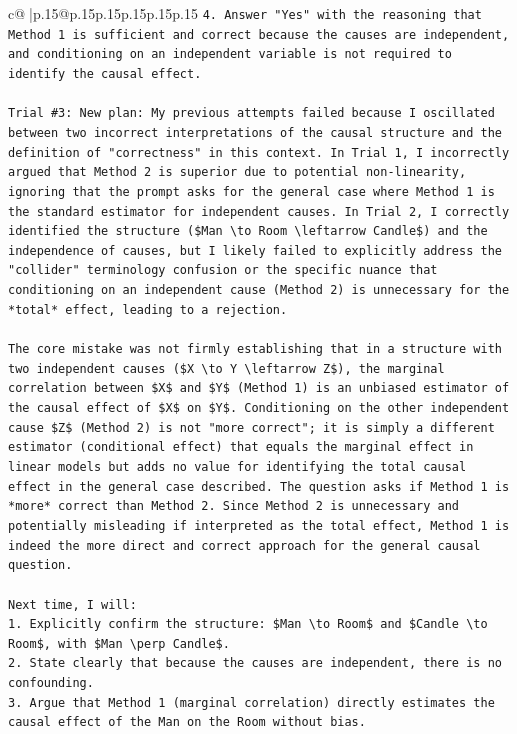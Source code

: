 \documentclass{article}
\begin{document}
{\begin{supertabular}{c@{$\;$}|p{.15\linewidth}@{}p{.15\linewidth}p{.15\linewidth}p{.15\linewidth}p{.15\linewidth}p{.15\linewidth}}
{{{\texttt{4.  Answer "Yes" with the reasoning that Method 1 is sufficient and correct because the causes are independent, and conditioning on an independent variable is not required to identify the causal effect.} \\
\\ 
\texttt{Trial \#3: New plan: My previous attempts failed because I oscillated between two incorrect interpretations of the causal structure and the definition of "correctness" in this context. In Trial 1, I incorrectly argued that Method 2 is superior due to potential non{-}linearity, ignoring that the prompt asks for the general case where Method 1 is the standard estimator for independent causes. In Trial 2, I correctly identified the structure (\$Man \textbackslash{}to Room \textbackslash{}leftarrow Candle\$) and the independence of causes, but I likely failed to explicitly address the "collider" terminology confusion or the specific nuance that conditioning on an independent cause (Method 2) is unnecessary for the *total* effect, leading to a rejection.} \\
\\ 
\texttt{The core mistake was not firmly establishing that in a structure with two independent causes (\$X \textbackslash{}to Y \textbackslash{}leftarrow Z\$), the marginal correlation between \$X\$ and \$Y\$ (Method 1) is an unbiased estimator of the causal effect of \$X\$ on \$Y\$. Conditioning on the other independent cause \$Z\$ (Method 2) is not "more correct"; it is simply a different estimator (conditional effect) that equals the marginal effect in linear models but adds no value for identifying the total causal effect in the general case described. The question asks if Method 1 is *more* correct than Method 2. Since Method 2 is unnecessary and potentially misleading if interpreted as the total effect, Method 1 is indeed the more direct and correct approach for the general causal question.} \\
\\ 
\texttt{Next time, I will:} \\
\texttt{1.  Explicitly confirm the structure: \$Man \textbackslash{}to Room\$ and \$Candle \textbackslash{}to Room\$, with \$Man \textbackslash{}perp Candle\$.} \\
\texttt{2.  State clearly that because the causes are independent, there is no confounding.} \\
\texttt{3.  Argue that Method 1 (marginal correlation) directly estimates the causal effect of the Man on the Room without bias.} \\
}}}
\end{supertabular}}
\end{document}

